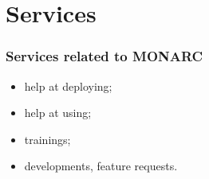 %
%
\section*{Services}
\begin{frame}
  \frametitle{Services related to MONARC}
  \begin{center}
    \begin{itemize}
      \item help at deploying;
      \item help at using;
      \item trainings;
      \item developments, feature requests.
    \end{itemize}
  \end{center}
\end{frame}
